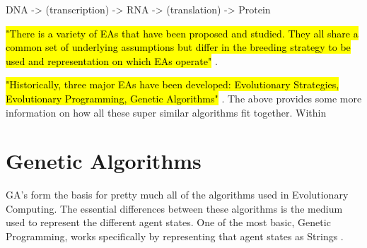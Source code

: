 DNA -> (transcription) -> RNA -> (translation) -> Protein






\hl{"There is a variety of EAs that have been proposed and studied. They all share a common set of underlying assumptions but differ in the breeding strategy to be used and representation on which EAs operate"} \cite{kicinger2005evolutionary}.


\hl{"Historically, three major EAs have been developed: Evolutionary Strategies, Evolutionary Programming, Genetic Algorithms"} \cite{kicinger2005evolutionary}.
The above provides some more information on how all these super similar algorithms fit together.
Within

\section{Genetic Algorithms}


GA's form the basis for pretty much all of the algorithms used in Evolutionary Computing. The essential differences between these algorithms is the medium used to represent the different agent states. One of the most basic, Genetic Programming, works specifically by representing that agent states as Strings \cite{de1988learning}.

